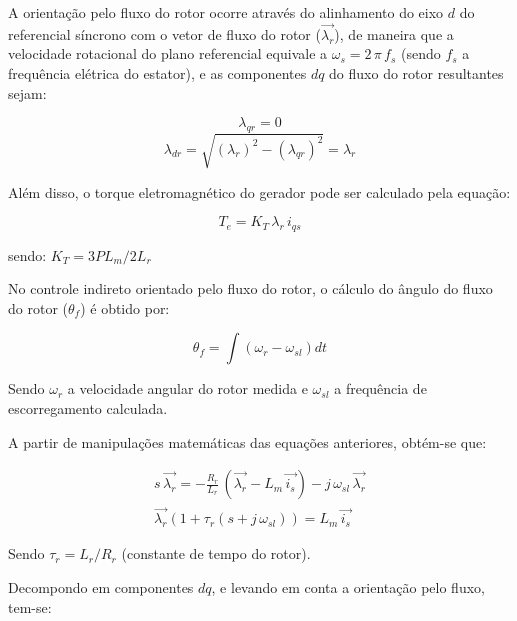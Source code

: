 A orientação pelo fluxo do rotor ocorre através do alinhamento do eixo $d$ do referencial síncrono com o vetor de fluxo do rotor ($ \vec{\lambda_{r}} $), de maneira que a velocidade rotacional do plano referencial equivale a $ \omega_{s} = 2\,\pi\,f_s $ (sendo $ f_s $ a frequência elétrica do estator), e as componentes $dq$ do fluxo do rotor resultantes sejam:

\begin{equation}
\label{eq:lambda_qr_orientfluxrotor}
  \lambda_{qr} = 0
\end{equation}
\begin{equation}
\label{eq:lambda_dr_orientfluxrotor}
  \lambda_{dr} = \sqrt{(\lambda_{r})^2 - (\lambda_{qr})^2} = \lambda_{r}
\end{equation}

Além disso, o torque eletromagnético do gerador pode ser calculado pela equação:

\begin{equation}
\label{eq:Te_lambda_iqs}
 T_e = K_T\,\lambda_{r}\,i_{qs}
\end{equation}

sendo: $ K_T = 3PL_m/2L_r $

No controle indireto orientado pelo fluxo do rotor, o cálculo do ângulo do fluxo do rotor ($ \theta_f $) é obtido por:

\begin{equation}
\label{eq:theta_f_intomega}
 \theta_f = \int (\omega_r - \omega_{sl})dt
\end{equation}

Sendo $ \omega_r $ a velocidade angular do rotor medida e $ \omega_{sl} $ a frequência de escorregamento calculada.

A partir de manipulações matemáticas das equações anteriores, obtém-se que:

\begin{equation}
\label{eq:lambda_r_is}
\begin{matrix}
  s\,\vec{\lambda_{r}} = -\frac{R_r}{L_r}\,(\vec{\lambda_{r}} - L_m\,\vec{i_{s}}) - j\,\omega_{sl}\,\vec{\lambda_{r}}
\\
  \vec{\lambda_{r}}(1 + \tau_r(s + j\,\omega_{sl})) = L_m\,\vec{i_{s}}
\end{matrix}
\end{equation}

Sendo $ \tau_r = L_r/R_r $ (constante de tempo do rotor).

Decompondo em componentes $dq$, e levando em conta a orientação pelo fluxo, tem-se:

